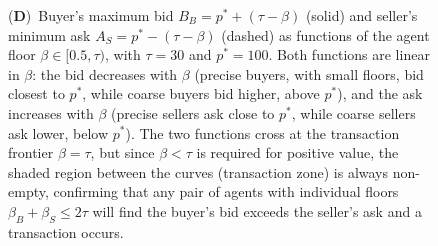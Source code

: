 \begin{figure}[!htbp]
{    (\textbf{D})~Buyer's maximum bid $B_B = p^* + (\tau - \beta)$ (solid) and seller's minimum ask $A_S = p^* - (\tau - \beta)$ (dashed) as functions of the agent floor $\beta \in [0.5, \tau)$, with $\tau = 30$ and $p^* = 100$.  Both functions are linear in $\beta$: the bid decreases with $\beta$ (precise buyers, with small floors, bid closest to $p^*$, while coarse buyers bid higher, above $p^*$), and the ask increases with $\beta$ (precise sellers ask close to $p^*$, while coarse sellers ask lower, below $p^*$).  The two functions cross at the transaction frontier $\beta = \tau$, but since $\beta < \tau$ is required for positive value, the shaded region between the curves (transaction zone) is always non-empty, confirming that any pair of agents with individual floors $\beta_B + \beta_S \leq 2\tau$ will find the buyer's bid exceeds the seller's ask and a transaction occurs.}
    \label{fig:price_panel_5}
\end{figure}
